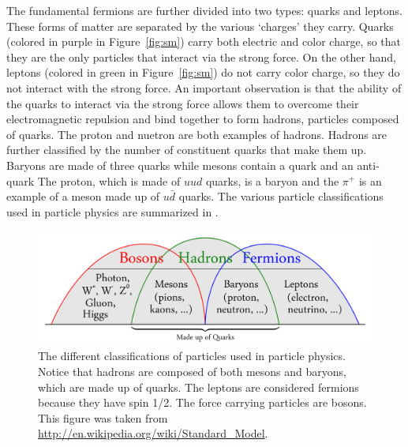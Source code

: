 The fundamental fermions are further divided into two types: quarks and leptons.
These forms of matter are separated by the various `charges' they carry. Quarks
(colored in purple in Figure~\ref{fig:sm})
carry both electric and color charge, so that they are the only particles that
interact via the strong force. 
On the other hand, leptons (colored in green in Figure~\ref{fig:sm}) 
do not carry color charge, so they do not interact with the strong force.
An important observation is that the ability of the quarks to interact via the
strong force allows them to overcome their electromagnetic repulsion and bind
together to form hadrons, particles composed of quarks. The proton and nuetron
are both examples of hadrons. Hadrons are further classified by the number
of constituent quarks that make them up. Baryons are made of three quarks while
mesons contain a quark and an anti-quark 
The proton, which is made of $uud$ quarks, is a baryon and
the $\pi^+$ is an example of a meson made up of $u\bar d$ quarks.
The various particle classifications used in particle physics are summarized in
.

\begin{figure}[htbp]
    \centering
    \includegraphics[scale=0.08, angle=0]{./figures/Bosons-Hadrons-Fermions}
    \caption{The different classifications of particles used in particle physics. Notice that hadrons are composed of both mesons and baryons, which are made up of quarks.
    The leptons are considered fermions because they have spin 1/2. The force carrying particles are bosons. This figure was taken from
    \url{http://en.wikipedia.org/wiki/Standard_Model}.}
    \label{fig:partclass}
\end{figure}

